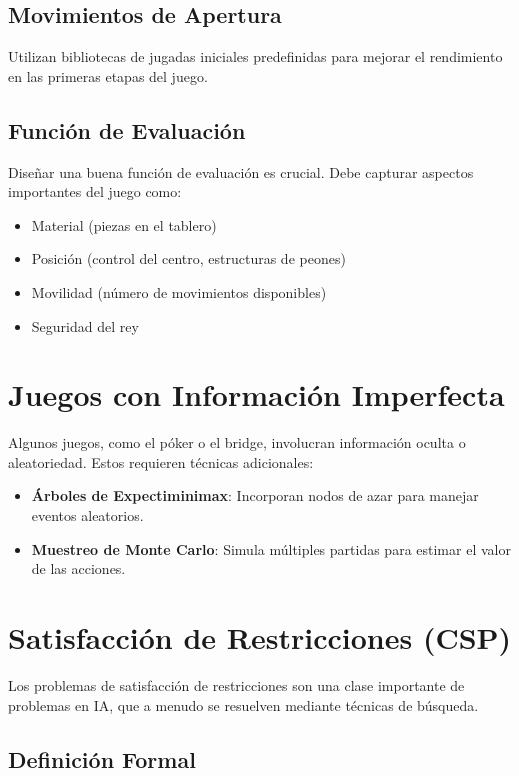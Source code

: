 \documentclass[12pt,a4paper]{report}
\begin{document}
	\subsection{Movimientos de Apertura}
	
	Utilizan bibliotecas de jugadas iniciales predefinidas para mejorar el rendimiento en las primeras etapas del juego.
	
	\subsection{Función de Evaluación}
	
	Diseñar una buena función de evaluación es crucial. Debe capturar aspectos importantes del juego como:
	\begin{itemize}
		\item Material (piezas en el tablero)
		\item Posición (control del centro, estructuras de peones)
		\item Movilidad (número de movimientos disponibles)
		\item Seguridad del rey
	\end{itemize}
	
	\section{Juegos con Información Imperfecta}
	
	Algunos juegos, como el póker o el bridge, involucran información oculta o aleatoriedad. Estos requieren técnicas adicionales:
	
	\begin{itemize}
		\item \textbf{Árboles de Expectiminimax}: Incorporan nodos de azar para manejar eventos aleatorios.
		\item \textbf{Muestreo de Monte Carlo}: Simula múltiples partidas para estimar el valor de las acciones.
	\end{itemize}
	
	\section{Satisfacción de Restricciones (CSP)}
	
	Los problemas de satisfacción de restricciones son una clase importante de problemas en IA, que a menudo se resuelven mediante técnicas de búsqueda.
	
	\subsection{Definición Formal}
	
\end{document}
